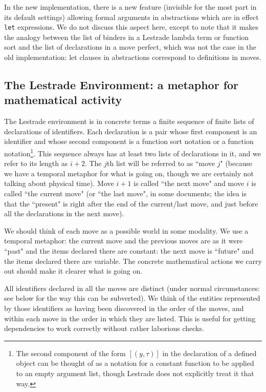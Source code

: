 \documentclass[12pt]{article}
\begin{document}
In the new implementation, there is a new feature (invisible for the most part in its default settings) allowing formal arguments in abstractions which are in effect {\tt let} expressions.  We do not discuss this aspect here, except to note that it makes the analogy between the list of binders in a Lestrade lambda term or function sort and the list of declarations in a move perfect, which was not the case in the old implementation:  let clauses in abstractions correspond to definitions in moves.

\subsection{The Lestrade Environment:  a metaphor for mathematical activity}

The Lestrade environment is in concrete terms a finite sequence of finite lists of declarations of identifiers.  Each declaration is a pair whose first component is  an identifier and whose second component is a function sort notation or a function notation\footnote{The second component of the form $[(y,\tau)]$ in the declaration of a defined object can be thought of as a notation for a constant function to be applied to an empty argument list, though Lestrade does not explicitly treat it that way.}.  This sequence always has at least two lists of declarations in it, and we refer to its length as $i+2$.  The $j$th list will be referred to as ``move $j$" (because we have a temporal metaphor for what is going on, though we are certainly not talking about physical time).  Move $i+1$ is called ``the next move" and move $i$ is called ``the current move" (or ``the last move", in some documents;  the idea is that the ``present" is right after the end of the current/last move, and just before all the declarations in the next move).

We should think of each move as a possible world in some modality.  We use a temporal metaphor:  the current move and the previous moves are as it were ``past" and the items declared there are constant:  the next move is ``future" and the items declared there are variable.  The concrete mathematical actions we carry out should make it clearer what is going on.

All identifiers declared in all the moves are distinct (under normal circumstances:  see below for the way this can be subverted).  We think of the entities represented by those identifiers as having been discovered in the order of the moves, and within each move in the order in which they are listed.  This is useful for getting dependencies to work correctly without rather laborious checks.
\end{document}
